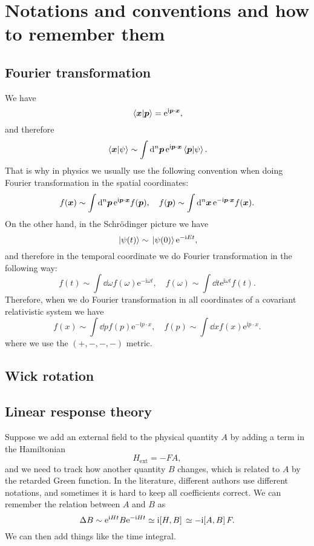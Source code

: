 \documentclass[hyperref, a4paper]{article}
\newcommand*{\ii}{\mathrm{i}}
\newcommand*{\ee}{\mathrm{e}}
\begin{document}
\section{Notations and conventions and how to remember them}

\subsection{Fourier transformation}

We have 
\[
    \braket*{\vb*{x}}{\vb*{p}} = \ee^{\ii \vb*{p} \cdot \vb*{x}},
\]
and therefore 
\[
    \braket*{\vb*{x}}{\psi} \sim \int \dd[n]{\vb*{p}} \ee^{\ii \vb*{p} \cdot \vb*{x}} \braket*{\vb*{p}}{\psi}.
\]
That is why in physics we usually use the following convention when doing Fourier transformation in the spatial coordinates:
\begin{equation}
    f(\vb*{x}) \sim \int \dd[n]{\vb*{p}} \ee^{\ii \vb*{p} \cdot \vb*{x}} f(\vb*{p}), \quad f(\vb*{p}) \sim \int \dd[n]{\vb*{x}} \ee^{- \ii \vb*{p} \cdot \vb*{x}} f(\vb*{x}).
\end{equation}
On the other hand, in the Schrödinger picture we have 
\[
    \ket*{\psi(t)} \sim \ket*{\psi(0)} \ee^{- \ii E t},
\]
and therefore in the temporal coordinate we do Fourier transformation in the following way:
\begin{equation}
    f(t) \sim \int \dd{\omega} f(\omega) \ee^{- \ii \omega t}, \quad f(\omega) \sim \int \dd{t} \ee^{\ii \omega t} f(t).
\end{equation}
Therefore, when we do Fourier transformation in all coordinates of a covariant relativistic system we have 
\begin{equation}
    f(x) \sim \int \dd{p} f(p) \ee^{- \ii p \cdot x}, \quad f(p) \sim \int \dd{x} f(x) \ee^{\ii p \cdot x}.
\end{equation}
where we use the $(+, -, -, -)$ metric.

\subsection{Wick rotation}

\subsection{Linear response theory}

Suppose we add an external field to the physical quantity $A$ by adding a term in the Hamiltonian
\begin{equation}
    H_\text{ext} = - F A,
\end{equation}
and we need to track how another quantity $B$ changes, which is related to $A$ by the retarded Green function. 
In the literature, different authors use different notations, and sometimes it is hard to keep all coefficients 
correct. We can remember the relation between $A$ and $B$ as 
\begin{equation}
    \Delta B \sim \ee^{\ii H t} B \ee^{- \ii H t} \simeq \ii \comm*{H}{B} \simeq - \ii \comm*{A}{B} F.
\end{equation}
We can then add things like the time integral.
\end{document}
